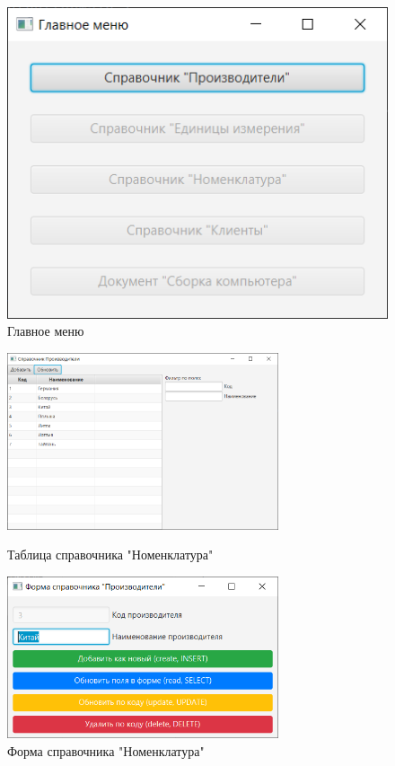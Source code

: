 \documentclass[12pt, a4paper, simple]{eskdtext}
\begin{document}
    \begin{figure}[!ph]
        \centering
        \includegraphics[]
            {_assets/View-Main.png}
        \caption{Главное меню}
        \label{fig:View-Main}
    \end{figure}

    \begin{figure}[!ph]
        \centering
        \begin{minipage}{0.49\textwidth}
            \centering
            \includegraphics[width=8cm]
                {_assets/View-Table-Producer.png}
            \caption{Таблица справочника "Номенклатура"}
            \label{fig:View-Table-Producer}
        \end{minipage}
        \begin{minipage}{0.49\textwidth}
            \centering
            \includegraphics[width=8cm]
                {_assets/View-Form-Producer.png}
            \caption{Форма справочника "Номенклатура"}
            \label{fig:View-Form-Producer}
        \end{minipage}
    \end{figure}
\end{document}
